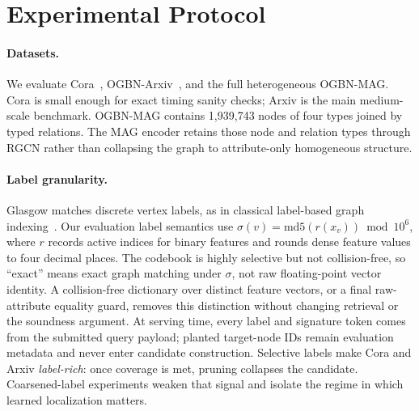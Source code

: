 \documentclass{article}
\begin{document}
\section{Experimental Protocol}

\paragraph{Datasets.}
We evaluate Cora~\cite{ref_cora}, OGBN-Arxiv~\cite{ref_ogb}, and the full heterogeneous OGBN-MAG. Cora is small enough for exact timing sanity checks; Arxiv is the main medium-scale benchmark. OGBN-MAG contains 1{,}939{,}743 nodes of four types joined by typed relations. The MAG encoder retains those node and relation types through RGCN rather than collapsing the graph to attribute-only homogeneous structure.

\paragraph{Label granularity.}\label{sec:protocol} Glasgow matches discrete vertex labels, as in classical label-based graph indexing~\cite{ref_graphgrep,ref_gindex}. Our evaluation label semantics use $\sigma(v)=\mathrm{md5}(r(x_v))\bmod 10^{6}$, where $r$ records active indices for binary features and rounds dense feature values to four decimal places. The codebook is highly selective but not collision-free, so ``exact'' means exact graph matching under $\sigma$, not raw floating-point vector identity. A collision-free dictionary over distinct feature vectors, or a final raw-attribute equality guard, removes this distinction without changing retrieval or the soundness argument. At serving time, every label and signature token comes from the submitted query payload; planted target-node IDs remain evaluation metadata and never enter candidate construction. Selective labels make Cora and Arxiv \emph{label-rich}: once coverage is met, pruning collapses the candidate. Coarsened-label experiments weaken that signal and isolate the regime in which learned localization matters.
\end{document}
